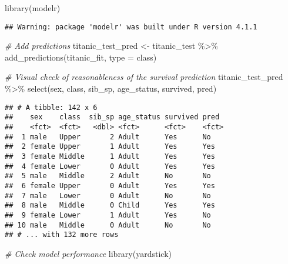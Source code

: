 \documentclass[
]{article}
\newenvironment{Shaded}{\begin{snugshade}}{\end{snugshade}}
\newcommand{\AttributeTok}[1]{\textcolor[rgb]{0.77,0.63,0.00}{#1}}
\newcommand{\CommentTok}[1]{\textcolor[rgb]{0.56,0.35,0.01}{\textit{#1}}}
\newcommand{\FunctionTok}[1]{\textcolor[rgb]{0.00,0.00,0.00}{#1}}
\newcommand{\NormalTok}[1]{#1}
\newcommand{\OtherTok}[1]{\textcolor[rgb]{0.56,0.35,0.01}{#1}}
\newcommand{\SpecialCharTok}[1]{\textcolor[rgb]{0.00,0.00,0.00}{#1}}
\newcommand{\StringTok}[1]{\textcolor[rgb]{0.31,0.60,0.02}{#1}}
\begin{document}
\begin{Shaded}
\begin{Highlighting}[]
\FunctionTok{library}\NormalTok{(modelr)}
\end{Highlighting}
\end{Shaded}

\begin{verbatim}
## Warning: package 'modelr' was built under R version 4.1.1
\end{verbatim}

\begin{Shaded}
\begin{Highlighting}[]
\CommentTok{\# Add predictions}
\NormalTok{titanic\_test\_pred }\OtherTok{\textless{}{-}}\NormalTok{ titanic\_test }\SpecialCharTok{\%\textgreater{}\%}
  \FunctionTok{add\_predictions}\NormalTok{(titanic\_fit, }\AttributeTok{type =} \StringTok{\textquotesingle{}class\textquotesingle{}}\NormalTok{)}
\end{Highlighting}
\end{Shaded}

\begin{Shaded}
\begin{Highlighting}[]
\CommentTok{\# Visual check of reasonableness of the survival prediction}
\NormalTok{titanic\_test\_pred }\SpecialCharTok{\%\textgreater{}\%} 
  \FunctionTok{select}\NormalTok{(sex, class, sib\_sp, age\_status, survived, pred)}
\end{Highlighting}
\end{Shaded}

\begin{verbatim}
## # A tibble: 142 x 6
##    sex    class  sib_sp age_status survived pred 
##    <fct>  <fct>   <dbl> <fct>      <fct>    <fct>
##  1 male   Upper       2 Adult      Yes      No   
##  2 female Upper       1 Adult      Yes      Yes  
##  3 female Middle      1 Adult      Yes      Yes  
##  4 female Lower       0 Adult      Yes      Yes  
##  5 male   Middle      2 Adult      No       No   
##  6 female Upper       0 Adult      Yes      Yes  
##  7 male   Lower       0 Adult      No       No   
##  8 male   Middle      0 Child      Yes      Yes  
##  9 female Lower       1 Adult      Yes      No   
## 10 male   Middle      0 Adult      No       No   
## # ... with 132 more rows
\end{verbatim}

\begin{Shaded}
\begin{Highlighting}[]
\CommentTok{\# Check model performance}
\FunctionTok{library}\NormalTok{(yardstick)}
\end{Highlighting}
\end{Shaded}
\end{document}
